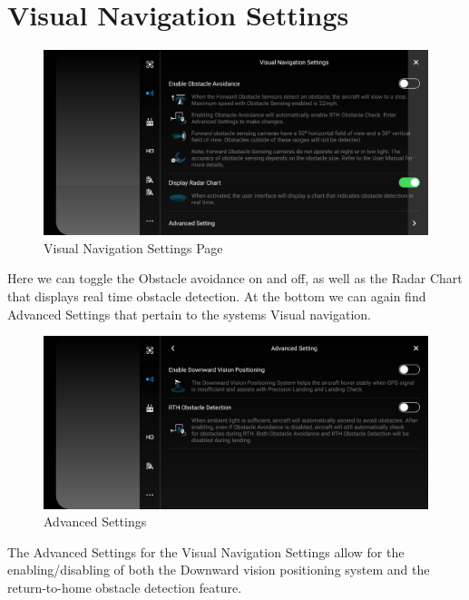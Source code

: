 \documentclass[
]{book}
\begin{document}
\hypertarget{visual-navigation-settings}{%
\section{Visual Navigation Settings}\label{visual-navigation-settings}}

\begin{figure}
\centering
\includegraphics{images/VN/DJI-VisualNavigationSettings.jpg}
\caption{Visual Navigation Settings Page}
\end{figure}

Here we can toggle the Obstacle avoidance on and off, as well as the Radar Chart that displays real time obstacle detection. At the bottom we can again find Advanced Settings that pertain to the systems Visual navigation.

\begin{figure}
\centering
\includegraphics{images/VN/DJI-VN-AdvancedSettings.jpg}
\caption{Advanced Settings}
\end{figure}

The Advanced Settings for the Visual Navigation Settings allow for the enabling/disabling of both the Downward vision positioning system and the return-to-home obstacle detection feature.
\end{document}
